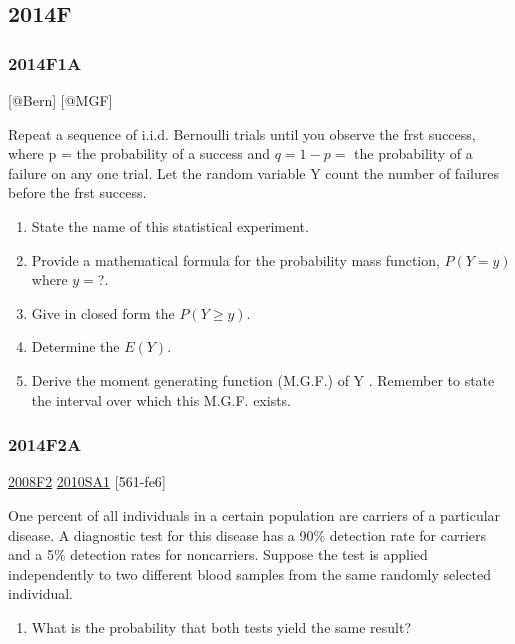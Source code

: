 \documentclass[10pt,twocolumn,portrait]{article}
\providecommand{\tightlist}{%
  \setlength{\itemsep}{0pt}\setlength{\parskip}{0pt}}
\begin{document}
\hypertarget{f-9}{%
\subsection{2014F}\label{f-9}}

\hypertarget{f1a-1}{%
\subsubsection{2014F1A}\label{f1a-1}}

{[}@Bern{]} {[}@MGF{]}

Repeat a sequence of i.i.d. Bernoulli trials until you observe the frst
success, where p = the probability of a success and \(q=1-p=\) the
probability of a failure on any one trial. Let the random variable Y
count the number of failures before the frst success.

\begin{enumerate}
\def\labelenumi{(\alph{enumi})}
\item
  State the name of this statistical experiment.
\item
  Provide a mathematical formula for the probability mass function,
  \(P(Y=y)\) where \(y=\)?.
\item
  Give in closed form the \(P(Y\ge y)\).
\item
  Determine the \(E(Y)\).
\item
  Derive the moment generating function (M.G.F.) of Y . Remember to
  state the interval over which this M.G.F. exists.
\end{enumerate}

\hypertarget{f2a-1}{%
\subsubsection{2014F2A}\label{f2a-1}}

\protect\hyperlink{f2-3}{2008F2} \protect\hyperlink{sa1-1}{2010SA1}
{[}561-fe6{]}

One percent of all individuals in a certain population are carriers of a
particular disease. A diagnostic test for this disease has a 90\%
detection rate for carriers and a 5\% detection rates for noncarriers.
Suppose the test is applied independently to two different blood samples
from the same randomly selected individual.

\begin{enumerate}
\def\labelenumi{(\alph{enumi})}
\tightlist
\item
  What is the probability that both tests yield the same result?
\end{enumerate}
\end{document}
